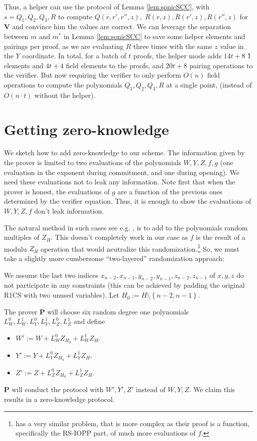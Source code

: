 \documentclass[11pt]{article}
\numberwithin{figure}{section} %
\newcommand{\set}[1]{\ensuremath{\left\{#1\right\}}\xspace}
\newcommand{\defeq}{:=}
\newcommand{\prv}{\ensuremath{\mathsf{\mathbf{P}}}\xspace}
\newcommand{\ver}{\ensuremath{\mathsf{\mathbf{V}}}\xspace}
\begin{document}
Thus, a helper can use the protocol of Lemma \ref{lem:sonicSCC}, with $s=Q_1,Q_2,Q_3,R$  to compute
$Q(r,r',r'',z),$ $R(r,z),R(r',z),R(r'',z)$ for \ver and convince him the values are correct. We can leverage the separation between $m$ and $m^*$ in Lemma \ref{lem:sonicSCC} to save some helper elements and pairings per proof, as
we are evaluating $R$ three times with the same $z$ value in the $Y$ coordinate.
In total, for a batch of $t$ proofs, the helper mode adds $14t+8$ \G1 elements and $4t+4$ field elements to the proofs,
and $20t+8$ pairing operations to the verifier.
But now requiring the verifier to only perform $O(n)$ field operations to compute the polynomials $Q_1,Q_2,Q_3,R$ at a single point, (instead of $O(n\cdot t)$ without the helper).



\section{Getting zero-knowledge}\label{sec:zk}
We sketch how to add zero-knowledge to our scheme.
The information given by the prover is limited to two evaluations of 
the polynomials $W,Y,Z,f,g$ (one evaluation in the exponent during commitment, and one during opening).
We need these evaluations not to leak any information.
Note first that when the prover is honest, the evaluations of $g$ are a function of the previous ones determined by the verifier equation.
Thus, it is enough to show the evaluations of $W,Y,Z,f$ don't leak information.

The natural method in such cases see e.g. \cite{GGPR,BCGV,aurora},
is to add to the polynomials random multiples of $Z_H$. This doesn't completely work in our case as $f$ is the result of a modulu $Z_H$ operation that would neutralize this randomization.\footnote{\cite{aurora} has a very similar problem, that is more complex as their proof is a function, specifically the RS-IOPP part, of much more evaluations of $f$.}
So, we must take a slightly more cumbersome ``two-layered'' randomization approach:

We assume the last two indices $x_{n-2},x_{n-1}, y_{n-2},y_{n-1},z_{n-2},z_{n-1}$
of $x,y,z$ do not participate in any constraints (this can be achieved by padding the original R1CS with two unused variables).
Let $H_0\defeq H\setminus\set{n-2,n-1}$.

The prover \prv will choose six random degree one polynomials 
$L^0_W,L^1_W, L^0_Y,L^1_Y,L^0_Z,L^1_Z$
and define 
\begin{itemize}
 \item $W'\defeq W+L^0_W Z_{H_0}+L^1_W Z_H$.
 \item $Y'\defeq Y+L^0_Y Z_{H_0}+L^1_Y Z_H$.
 \item $Z'\defeq Z+L^0_Z Z_{H_0}+L^1_Z Z_H$.
\end{itemize}
\prv will conduct the protocol with $W',Y',Z'$ instead of $W,Y,Z$.
We claim this results in a zero-knowledge protocol.
\end{document}
